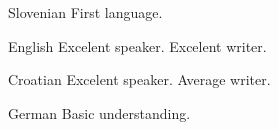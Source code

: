 

\begin{cvskills}


\cvskill
{Slovenian} %
{First language.} %


\cvskill
{English} %
{Excelent speaker. Excelent writer.} %


\cvskill
{Croatian} %
{Excelent speaker. Average writer.} %


\cvskill
{German} %
{Basic understanding.} %

\end{cvskills}



